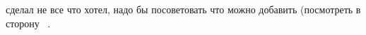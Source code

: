 \Conclusion

сделал не все что хотел, надо бы посоветовать что можно добавить (посмотреть в
сторону ~\cite{mp}.
